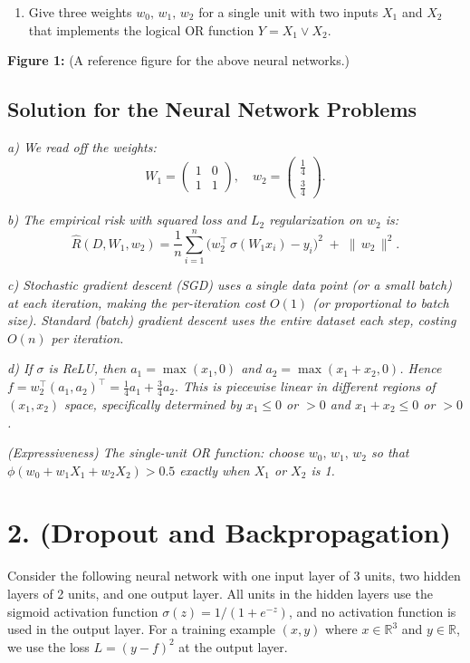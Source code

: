 \documentclass[twocolumn]{article}
\begin{document}
\begin{spacing}{1}
\begin{enumerate}
\item Give three weights $w_0,\,w_1,\,w_2$ for a single unit with two inputs $X_1$ and $X_2$ that implements
the logical OR function $Y = X_1 \lor X_2$.
\end{enumerate}

\bigskip
\noindent
\textbf{Figure 1:} (A reference figure for the above neural networks.)

\subsection*{Solution for the Neural Network Problems}

\noindent
\emph{a) We read off the weights:}
\[
W_1 = 
\begin{pmatrix}
1 & 0 \\
1 & 1
\end{pmatrix},
\quad
w_2 =
\begin{pmatrix}
\tfrac{1}{4} \\[4pt]
\tfrac{3}{4}
\end{pmatrix}.
\]

\noindent
\emph{b) The empirical risk with squared loss and $L_2$ regularization on $w_2$ is:}
\[
\hat{R}(D,W_1,w_2) = \frac{1}{n} \sum_{i=1}^n \bigl(w_2^\top\,\sigma(W_1 x_i) - y_i\bigr)^2 
\;+\;\|\,w_2\,\|^2.
\]

\noindent
\emph{c) Stochastic gradient descent (SGD) uses a single data point (or a small batch) at each iteration, 
making the per-iteration cost $O(1)$ (or proportional to batch size). Standard (batch) gradient descent
uses the entire dataset each step, costing $O(n)$ per iteration.}

\noindent
\emph{d) If $\sigma$ is ReLU, then $a_1 = \max(x_1,0)$ and $a_2 = \max(x_1 + x_2,0)$. 
Hence $f = w_2^\top (a_1,a_2)^\top = \tfrac{1}{4}a_1 + \tfrac{3}{4}a_2.$ This is piecewise linear in different
regions of $(x_1,x_2)$ space, specifically determined by $x_1 \le 0$ or $>0$ and $x_1 + x_2 \le 0$ or $> 0$.}

\noindent
\emph{(Expressiveness) The single-unit OR function: choose $w_0,\,w_1,\,w_2$ so that 
$\phi(w_0 + w_1 X_1 + w_2 X_2)>0.5$ exactly when $X_1$ or $X_2$ is 1.}


\section{2. (Dropout and Backpropagation)}

Consider the following neural network with one input layer of 3 units, two hidden layers of 2 units, 
and one output layer. All units in the hidden layers use the sigmoid activation function
$\sigma(z)=1/(1+e^{-z})$, and no activation function is used in the output layer. For a training example
$(x,y)$ where $x \in \mathbb{R}^3$ and $y \in \mathbb{R}$, we use the loss $L=(y - f)^2$ at the output layer.


\end{spacing}
\end{document}
